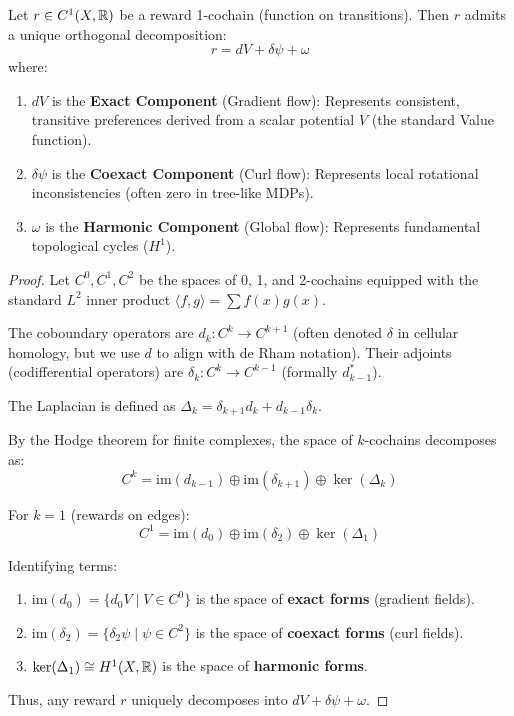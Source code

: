 \begin{theorem}
\label{thm:hodge_full}
Let $r \in C^1(X, \mathbb{R})$ be a reward 1-cochain (function on transitions). Then $r$ admits a unique orthogonal decomposition:
\begin{equation}
r = dV + \delta \psi + \omega
\end{equation}
where:
\begin{enumerate}
    \item $dV$ is the \textbf{Exact Component} (Gradient flow): Represents consistent, transitive preferences derived from a scalar potential $V$ (the standard Value function).
    \item $\delta \psi$ is the \textbf{Coexact Component} (Curl flow): Represents local rotational inconsistencies (often zero in tree-like MDPs).
    \item $\omega$ is the \textbf{Harmonic Component} (Global flow): Represents fundamental topological cycles ($H^1$).
\end{enumerate}
\end{theorem}

\begin{proof}
Let $C^0, C^1, C^2$ be the spaces of 0, 1, and 2-cochains equipped with the standard $L^2$ inner product $\langle f, g \rangle = \sum f(x)g(x)$.

The coboundary operators are $d_k: C^k \to C^{k+1}$ (often denoted $\delta$ in cellular homology, but we use $d$ to align with de Rham notation). Their adjoints (codifferential operators) are $\delta_k: C^k \to C^{k-1}$ (formally $d_{k-1}^*$).

The Laplacian is defined as $\Delta_k = \delta_{k+1} d_k + d_{k-1} \delta_k$.

By the Hodge theorem for finite complexes, the space of $k$-cochains decomposes as:
\begin{equation}
C^k = \text{im}(d_{k-1}) \oplus \text{im}(\delta_{k+1}) \oplus \ker(\Delta_k)
\end{equation}

For $k=1$ (rewards on edges):
\begin{equation}
C^1 = \text{im}(d_0) \oplus \text{im}(\delta_2) \oplus \ker(\Delta_1)
\end{equation}

Identifying terms:
\begin{enumerate}
    \item $\text{im}(d_0) = \{ d_0 V \mid V \in C^0 \}$ is the space of \textbf{exact forms} (gradient fields).
    \item $\text{im}(\delta_2) = \{ \delta_2 \psi \mid \psi \in C^2 \}$ is the space of \textbf{coexact forms} (curl fields).
    \item $\ker(\Delta_1) \cong H^1(X, \mathbb{R})$ is the space of \textbf{harmonic forms}.
\end{enumerate}

Thus, any reward $r$ uniquely decomposes into $dV + \delta \psi + \omega$.
\end{proof}

